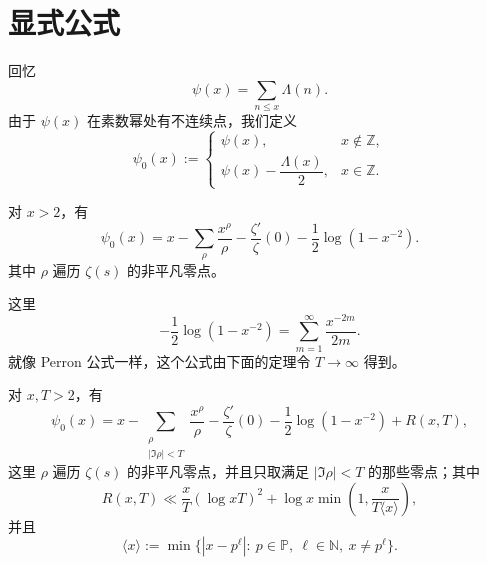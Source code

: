 \section{显式公式}

回忆
\[
	\psi(x)=\sum_{n\leq x}\Lambda(n).
\]
由于 $\psi(x)$ 在素数幂处有不连续点，我们定义
\[
	\psi_0(x)
	:=
	\begin{cases}
		\psi(x), & x\notin\mathbb Z,\\
		\psi(x)-\dfrac{\Lambda(x)}{2}, & x\in\mathbb Z.
	\end{cases}
\]

\begin{theorem}
	对 $x>2$，有
	\[
		\psi_0(x)
		=
		x
		-
		\sum_\rho \frac{x^\rho}{\rho}
		-
		\frac{\zeta'}{\zeta}(0)
		-
		\frac12\log(1-x^{-2}).
	\]
	其中 $\rho$ 遍历 $\zeta(s)$ 的非平凡零点。
\end{theorem}

这里
\[
	-\frac12\log(1-x^{-2})
	=
	\sum_{m=1}^{\infty}\frac{x^{-2m}}{2m}.
\]
就像 Perron 公式一样，这个公式由下面的定理令 $T\to\infty$ 得到。

\begin{theorem}
	对 $x,T>2$，有
	\begin{equation}
		\psi_0(x)
		=
		x
		-
		\sum_{\substack{\rho\\ |\Im\rho|<T}}\frac{x^\rho}{\rho}
		-
		\frac{\zeta'}{\zeta}(0)
		-
		\frac12\log(1-x^{-2})
		+
		R(x,T),
		\tag{10.4}
	\end{equation}
	这里 $\rho$ 遍历 $\zeta(s)$ 的非平凡零点，并且只取满足
	$|\Im\rho|<T$ 的那些零点；其中
	\[
		R(x,T)
		\ll
		\frac{x}{T}(\log xT)^2
		+
		\log x\min\left(1,\frac{x}{T\langle x\rangle}\right),
	\]
	并且
	\[
		\langle x\rangle
		:=
		\min\{|x-p^\ell|:\ p\in\mathbb P,\ \ell\in\mathbb N,\ x\neq p^\ell\}.
	\]
\end{theorem}

